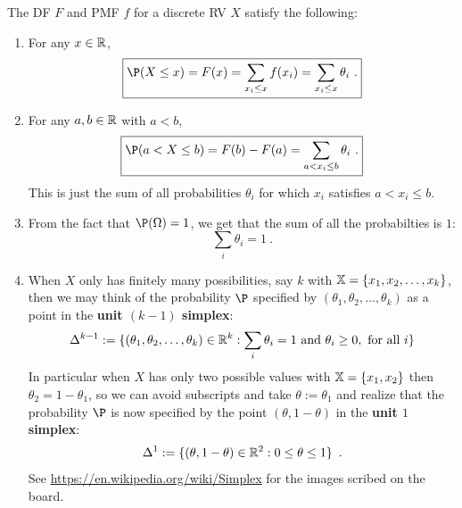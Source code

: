 The DF $F$ and PMF $f$ for a discrete RV $X$ satisfy the following:
\begin{enumerate}
\item  For any $x \in \mathbb{R}$, 
\begin{equation}\label{Eq:DiscreteDF}
\boxed{\P(X \leq x) = F(x)  = \sum_{x_i \leq x} f(x_i) = \sum_{x_i \leq x} \theta_i \ .}
\end{equation}
\item For any $a,b \in \mathbb{R}$ with $a<b$,
\begin{equation}\label{E:DRVFab}
\boxed{\P(a < X \leq b) = F(b) - F(a) = \sum_{a < x_i \leq b} \theta_i \ .}
\end{equation}
This is just the sum of all probabilities $\theta_i$ for which $x_i$ satisfies $a<x_i \leq b$. 
\item
From the fact that $\P(\Omega)=1$, we get that the sum of all the probabilties is $1$:
\begin{equation}\label{E:DRVsumofP}
\boxed{\sum_i \theta_i = 1 \ .}
\end{equation}
\item
When $X$ only has finitely many possibilities, say $k$ with $\mathbb{X} = \{x_1,x_2,\ldots,x_k\}$, then we may think of the probability $\P$ specified by $(\theta_1,\theta_2,\ldots,\theta_k)$ as a point in the \textbf{unit $(k-1)$ simplex}:
\begin{equation}\label{E:unitk-1simplex}
\Delta^{k-1} := \{ (\theta_1,\theta_2,\ldots,\theta_k) \in \mathbb{R}^{k} : \sum_i \theta_i = 1 \text{ and } \theta_i \geq 0, \text{ for all } i\}
\end{equation}
In particular when $X$ has only two possible values with $\mathbb{X} = \{x_1,x_2\}$ then $\theta_2=1-\theta_1$, so we can avoid subscripts and take $\theta := \theta_1$ and realize that the probability $\P$ is now specified by the point $(\theta,1-\theta)$ in the \textbf{unit $1$ simplex}:
\begin{equation}\label{E:unit1simplex}
\Delta^{1} := \{ (\theta,1-\theta) \in \mathbb{R}^2 : 0 \leq \theta \leq 1 \} \enspace .
\end{equation}
See \url{https://en.wikipedia.org/wiki/Simplex} for the images scribed on the board.
\end{enumerate}


